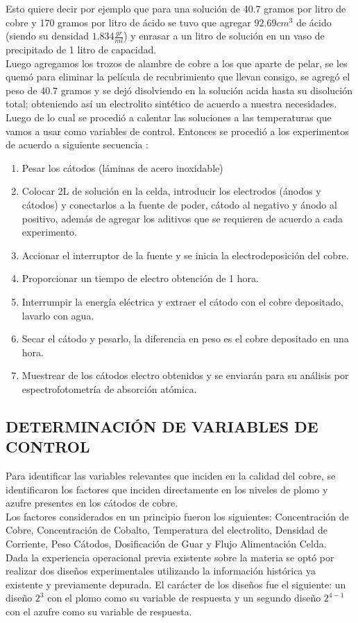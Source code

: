 Esto quiere decir por ejemplo que para una soluci\'on de 40.7 gramos por litro de cobre y 170 gramos por litro de \'acido se tuvo que  agregar $92.69cm^3$ de \'acido (siendo su densidad $1.834\frac{gr}{ml}$) y enrasar a un litro de soluci\'on en un vaso de precipitado de 1 litro de capacidad. \\
Luego agregamos los trozos de alambre de cobre a los que aparte de pelar, se les quem\'o para eliminar la película de recubrimiento que llevan consigo, se agreg\'o el peso de 40.7 gramos y se dej\'o disolviendo en la soluci\'on acida hasta su disoluci\'on total; obteniendo as\'i un electrolito sint\'etico de acuerdo a nuestra necesidades. \\
Luego de lo cual se procedi\'o a calentar las soluciones a las temperaturas que vamos a usar como variables de control.
Entonces se procedi\'o a los experimentos de acuerdo a siguiente secuencia :
\begin{enumerate}
 \item Pesar los c\'atodos (l\'aminas de acero inoxidable) 
 \item  Colocar 2L de soluci\'on en la celda, introducir los electrodos (\'anodos y c\'atodos) y conectarlos a la fuente de poder, c\'atodo al negativo y \'anodo al positivo, adem\'as de agregar los aditivos que se requieren de acuerdo a cada experimento. 
 \item  Accionar el interruptor de la fuente y se inicia la electrodeposici\'on del cobre. 
 \item  Proporcionar un tiempo de electro obtenci\'on de 1 hora. 
 \item  Interrumpir la energ\'ia el\'ectrica y extraer el c\'atodo con el cobre depositado, lavarlo con agua. 
 \item  Secar el c\'atodo y pesarlo, la diferencia en peso es el cobre depositado en una hora. 
 \item  Muestrear de los c\'atodos electro obtenidos y se enviar\'an para su an\'alisis por espectrofotometr\'ia de absorci\'on at\'omica.
\end{enumerate}

\subsection{DETERMINACI\'ON DE VARIABLES DE CONTROL}
Para identificar las variables relevantes que inciden en la calidad del cobre, se identificaron los factores que inciden directamente en los niveles de plomo y azufre presentes en los c\'atodos de cobre.\\
Los factores considerados en un principio fueron los siguientes:
Concentraci\'on de Cobre, Concentraci\'on de Cobalto, Temperatura del electrolito, Densidad de Corriente, Peso C\'atodos, Dosificaci\'on de Guar y Flujo Alimentaci\'on Celda.\\
Dada la experiencia operacional previa existente sobre la materia se opt\'o por realizar dos dise\~nos experimentales utilizando la informaci\'on hist\'orica ya existente y previamente depurada. El car\'acter de los dise\~nos fue el siguiente: un dise\~no $2^3$ con el plomo como su variable de respuesta y un segundo dise\~no $2^{4-1}$ con el azufre como su variable de respuesta.

